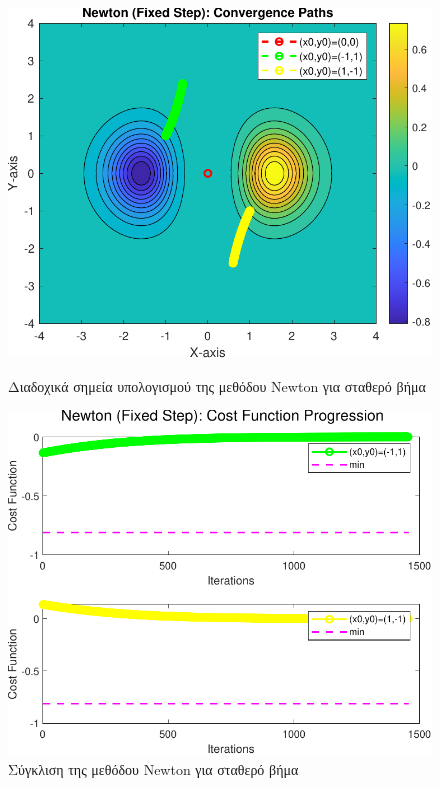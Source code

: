 \documentclass[a4paper,12pt]{article}
\begin{document}
\begin{figure}[h]
    \centering
    \begin{minipage}{0.47\textwidth}
        \centering
        \includegraphics[width=1\linewidth]{plot/newton_fixed_step_contour.pdf}
        \caption{\small Διαδοχικά σημεία υπολογισμού της μεθόδου  Newton  για σταθερό βήμα}
        \label{fig:newton_fixed_step_contour}
    \end{minipage} \hfill
    \begin{minipage}{0.47\textwidth}
        \centering
        \includegraphics[width=1\linewidth]{plot/newton_fixed_step_costs.pdf}
        \caption{\small Σύγκλιση της μεθόδου  Newton  για σταθερό βήμα}
        \label{fig:newton_fixed_step_costs}
    \end{minipage}
\end{figure}
\end{document}
